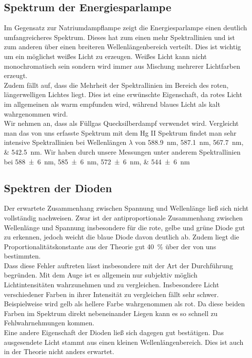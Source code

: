 \subsection{Spektrum der Energiesparlampe}
Im Gegensatz zur Natriumdampflampe zeigt die Energiesparlampe einen deutlich umfangreicheres Spektrum. Dieses hat zum einen mehr Spektrallinien und ist zum anderen über einen breiteren Wellenlängenbereich verteilt. Dies ist wichtig um ein möglichst weißes Licht zu erzeugen. Weißes Licht kann nicht monochromatisch sein sondern wird immer aus Mischung mehrerer Lichtfarben erzeugt.\\
Zudem fällt auf, dass die Mehrheit der Spektrallinien im Bereich des roten, längerwelligen Lichtes liegt. Dies ist eine erwünschte Eigenschaft, da rotes Licht im allgemeinen als warm empfunden wird, während blaues Licht als kalt wahrgenommen wird. \\
Wir nehmen an, dass als Füllgas Quecksilberdampf verwendet wird. Vergleicht man das von uns erfasste Spektrum mit dem Hg II Spektrum \cite{NIST_ASD} findet man sehr intensive Spektrallinien bei Wellenlängen $ \lambda $ von \SIlist{588,9; 587.1;567.7;542.5}{\nano\meter}. Wir haben durch unsere Messungen unter anderem Spektrallinien bei \SIlist{588(6);585(6);572(6);544(6)}{\nano\meter}

\subsection{Spektren der Dioden}
Der erwartete Zusammenhang zwischen Spannung und Wellenlänge ließ sich nicht vollständig nachweisen. Zwar ist der antiproportionale Zusammenhang zwischen Wellenlänge und Spannung insbesondere für die rote, gelbe und grüne Diode gut zu erkennen, jedoch weicht die blaue Diode davon deutlich ab. Zudem liegt die Proportionalitätskonstante aus der Theorie gut \SI{40}{\percent} über der von uns bestimmten. \\
Dass diese Fehler auftreten lässt insbesondere mit der Art der Durchführung begründen. Mit dem Auge ist es allgemein nur subjektiv möglich Lichtintensitäten wahrzunehmen und zu vergleichen. Insbesondere Licht verschiedener Farben in ihrer Intensität zu vergleichen fällt sehr schwer. Beispielweise wird gelb als hellere Farbe wahrgenommen als rot. Da diese beiden Farben im Spektrum direkt nebeneinander Liegen kann es so schnell zu Fehlwahrnehmungen kommen. \\
Eine andere Eigenschaft der Dioden ließ sich dagegen gut bestätigen. Das ausgesendete Licht stammt aus einen kleinen Wellenlängenbereich. Dies ist auch in der Theorie nicht anders erwartet.
